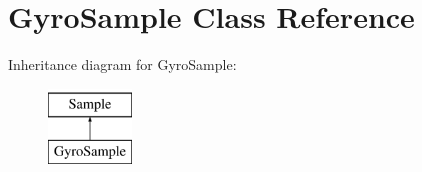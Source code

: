 \hypertarget{class_gyro_sample}{\section{\-Gyro\-Sample \-Class \-Reference}
\label{class_gyro_sample}
}
\-Inheritance diagram for \-Gyro\-Sample\-:\begin{figure}[H]
\begin{center}
\leavevmode
\includegraphics[height=2.000000cm]{class_gyro_sample}
\end{center}
\end{figure}
